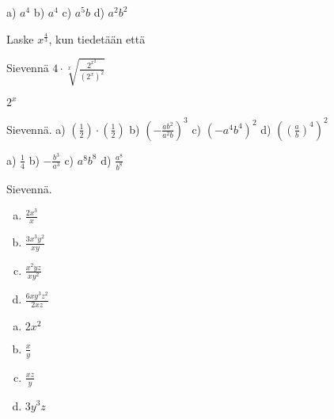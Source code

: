 \begin{tehtavasivu}
\begin{tehtava}
        \begin{vastaus}
            a) $ a^4$ 
            b) $a^4$ 
            c) $a^5b$ 
            d) $a^2b^2$
        \end{vastaus}
    \end{tehtava}

    \begin{tehtava}
Laske $x^{\frac{4}{3}}$, kun tiedetään että
    \begin{alakohdat}
     \end{alakohdat}
\begin{vastaus}
\begin{alakohdat}
\end{alakohdat}
\end{vastaus}
    \end{tehtava}
 
 \begin{tehtava}
Sievennä 
$4 \cdot \sqrt[x]{\frac{2^{x^2}}{(2^x)^2}}$
\begin{vastaus}
$2^x$
\end{vastaus}

 \end{tehtava}

 \begin{tehtava}
        Sievennä. 
        a) $(\frac{1}{2})\cdot(\frac{1}{2})$ 
        b) $(-\frac{ab^2}{a^2b})^3$ 
        c) $(-a^4b^4)^2$ 
        d) $\left((\frac{a}{b})^4\right)^2$
        
        \begin{vastaus}
            a) $\frac{1}{4}$ 
            b) $-\frac{b^3}{a^3}$ 
            c) $a^8b^8$ 
            d) $\frac{a^8}{b^8}$
        \end{vastaus}
    \end{tehtava}
\begin{tehtava}
Sievennä.
	\begin{enumerate}[a)]
	\item $\frac{2x^3}{x}$
	\item $\frac{3x^3y^2}{xy}$
	\item $\frac{x^2yz}{xy^2}$
	\item $\frac{6xy^3z^2}{2xz}$
	\end{enumerate}

\begin{vastaus}
	\begin{enumerate}[a)]
	\item $2x^2$
	\item $\frac{x}{y}$
	\item $\frac{xz}{y}$
	\item $3y^3z$
	\end{enumerate}
\end{vastaus}
\end{tehtava}


\end{tehtavasivu}
